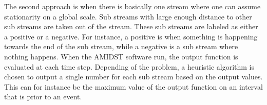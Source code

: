 The second approach is when there is basically one stream where one can assume stationarity on a global scale.  Sub streams with large enough distance to other sub streams are taken out of the stream.  These sub streams are labeled as either a positive or a negative.  For instance, a positive is when something is happening towards the end of the sub stream, while a negative is a sub stream where nothing happens.  When the AMIDST software run, the output function is evaluated at each time step.  Depending of the problem, a heuristic algorithm is chosen to output a single number for each sub stream based on the output values.  This can for instance be the maximum value of the output function on an interval that is prior to an event.  






 

%
